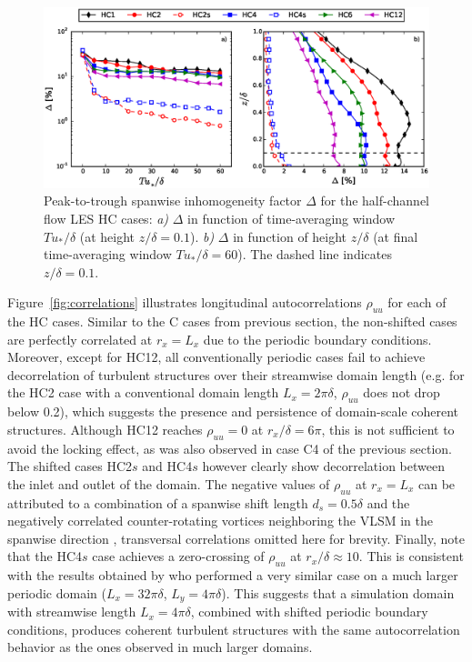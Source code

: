 		\begin{figure}
						\centering
			\includegraphics[width=\textwidth, trim= 0cm 0.15cm 0cm 0.cm,clip]{chapters/turbulent_inflow/spbc/figure8}
			\caption{Peak-to-trough spanwise inhomogeneity factor $\Delta$ for the half-channel flow LES HC cases: \emph{a)} $\Delta$ in function of time-averaging window $Tu_*/\delta$ (at height $z/\delta = 0.1$). \emph{b)} $\Delta$ in function of height $z/\delta$ (at final time-averaging window $Tu_*/\delta = 60$). The dashed line indicates $z/\delta = 0.1$.}
			\label{fig:delta_factorHC}
		\end{figure}
		
		Figure~\ref{fig:correlations} illustrates longitudinal autocorrelations $\rho_{uu}$ for each of the HC cases. Similar to the C cases
		from previous section, the non-shifted cases  are perfectly correlated at $r_x = L_x$ due to the periodic boundary conditions.
		Moreover, except for HC12, all conventionally periodic cases fail to achieve decorrelation of turbulent structures over their
		streamwise domain length (e.g. for the HC2 case with a conventional domain length $L_x = 2\pi\delta$,  $\rho_{uu}$ does not drop below
		0.2), which suggests the presence and persistence of domain-scale coherent structures. Although HC12 reaches $\rho_{uu} = 0$ at
		$r_x/\delta = 6\pi$, this is not sufficient to avoid the locking effect, as was also observed in case C4 of the previous section. The
		shifted cases HC2$s$ and HC4$s$ however  clearly show decorrelation between the inlet and outlet of the domain. The negative values of
		$\rho_{uu}$ at $r_x = L_x$ can be attributed to a combination of a spanwise shift length $d_s = 0.5 \delta$ and the negatively
		correlated counter-rotating vortices neighboring the VLSM in the spanwise direction \citep{tomkins2003spanwise, hutchins2012towards} ,
		transversal correlations omitted here for brevity. Finally, note that the HC4$s$ case achieves a zero-crossing of $\rho_{uu}$ at
		$r_x/\delta \approx 10$.  This is consistent with the results obtained by \cite{fang2015large} who performed a very similar case on a
		much larger periodic domain ($L_x = 32\pi\delta$, $L_y = 4\pi\delta$). This suggests that a simulation domain with streamwise length $L_x = 4\pi\delta$, combined with shifted periodic boundary conditions, produces coherent turbulent structures with the same autocorrelation behavior as the ones observed in much larger domains. 
		
